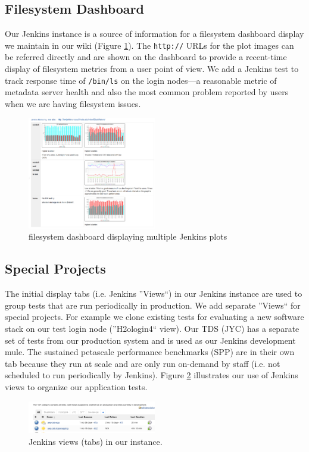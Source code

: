 \documentclass[AMA]{WileyNJD-v1}
\begin{document}
\subsection{Filesystem Dashboard}
Our Jenkins instance is a source of information for a filesystem dashboard display we maintain in our wiki (Figure \ref{fig:wiki-dashboard}). The \texttt{http://} URLs for the plot images can be referred directly and are shown on the dashboard to provide a recent-time display of filesystem metrics from a user point of view. We add a Jenkins test to track response time of \texttt{/bin/ls} on the login nodes---a reasonable metric of metadata server health and also the most common problem reported by users when we are having filesystem issues.
\begin{figure}[H]
\centering
\includegraphics[width=0.5\textwidth]{wiki-dashboard}
\caption{ filesystem dashboard displaying multiple Jenkins plots }
\label{fig:wiki-dashboard}
\end{figure}

\subsection{Special Projects}
The initial display tabs (i.e. Jenkins ''Views``) in our Jenkins instance are used to group tests that are run periodically in production. We add separate ''Views`` for special projects. For example we clone existing tests for evaluating a new software stack on our test login node (''H2ologin4`` view).  Our TDS (JYC) has a separate set of tests from our production system and is used as our Jenkins development mule. The sustained petascale performance benchmarks (SPP) are in their own tab because they run at scale and are only run on-demand by staff (i.e. not scheduled to run periodically by Jenkins). Figure \ref{fig:tabs-display} illustrates our use of Jenkins views to organize our application tests.
\begin{figure}[H]
\centering
\includegraphics[width=0.5\textwidth]{tabs-display}
\caption{Jenkins views (tabs) in our instance.}
\label{fig:tabs-display}
\end{figure}
\end{document}
